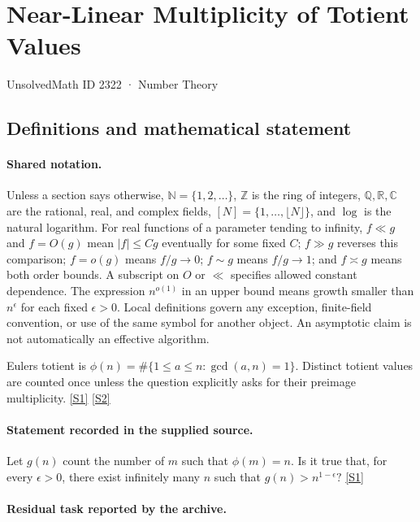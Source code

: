 \documentclass[11pt,a4paper]{article}
\newcommand{\N}{\mathbb{N}}
\newcommand{\Z}{\mathbb{Z}}
\newcommand{\Q}{\mathbb{Q}}
\newcommand{\R}{\mathbb{R}}
\newcommand{\C}{\mathbb{C}}
\newcommand{\sref}[2]{\hyperlink{source:#1:#2}{[S#2]}}
\begin{document}

\setcounter{section}{2321}

\section{Near-Linear Multiplicity of Totient Values}\label{2322}

{\small\sffamily UnsolvedMath ID 2322 · Number Theory}

\subsection{Definitions and mathematical statement}

\paragraph{Shared notation.}Unless a section says otherwise, $\N=\{1,2,\ldots\}$,
$\Z$ is the ring of integers, $\Q,\R,\C$ are the rational, real, and complex
fields, $[N]=\{1,\ldots,\lfloor N\rfloor\}$, and $\log$ is the natural
logarithm. For real functions of a parameter tending to infinity,
$f\ll g$ and $f=O(g)$ mean $|f|\leq Cg$ eventually for some fixed $C$;
$f\gg g$ reverses this comparison; $f=o(g)$ means $f/g\to0$;
$f\sim g$ means $f/g\to1$; and $f\asymp g$ means both order bounds.
A subscript on $O$ or $\ll$ specifies allowed constant dependence.
The expression $n^{o(1)}$ in an upper bound means growth smaller than
$n^\epsilon$ for each fixed $\epsilon>0$. Local definitions govern any
exception, finite-field convention, or use of the same symbol for another
object. An asymptotic claim is not automatically an effective algorithm.



Euler\textquotesingle s totient is $\phi(n)=\#\{1\leq a\leq n:\gcd(a,n)=1\}$. Distinct totient values are counted once unless the question explicitly asks for their preimage multiplicity. \sref{2322}{1} \sref{2322}{2}

\paragraph{Statement recorded in the supplied source.}
Let $g(n)$ count the number of $m$ such that $\phi(m)=n$. Is it true that, for every $\epsilon>0$, there exist infinitely many $n$ such that $ g(n) > n^{1-\epsilon}? $ \sref{2322}{1}

\paragraph{Residual task reported by the archive.}
\end{document}
